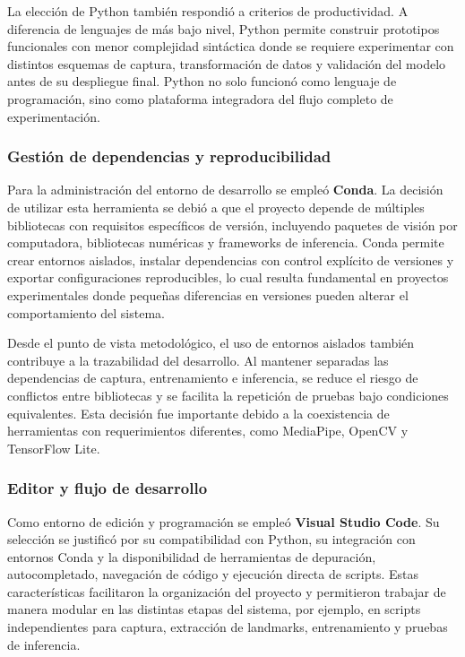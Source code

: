 	La elección de Python también respondió a criterios de productividad. A diferencia de lenguajes de más bajo nivel, Python permite construir prototipos funcionales con menor complejidad sintáctica donde se requiere experimentar con distintos esquemas de captura, transformación de datos y validación del modelo antes de su despliegue final. Python no solo funcionó como lenguaje de programación, sino como plataforma integradora del flujo completo de experimentación.
	
	\subsubsection{Gestión de dependencias y reproducibilidad}
	
	Para la administración del entorno de desarrollo se empleó \textbf{Conda}. La decisión de utilizar esta herramienta se debió a que el proyecto depende de múltiples bibliotecas con requisitos específicos de versión, incluyendo paquetes de visión por computadora, bibliotecas numéricas y frameworks de inferencia. Conda permite crear entornos aislados, instalar dependencias con control explícito de versiones y exportar configuraciones reproducibles, lo cual resulta fundamental en proyectos experimentales donde pequeñas diferencias en versiones pueden alterar el comportamiento del sistema.
	
	Desde el punto de vista metodológico, el uso de entornos aislados también contribuye a la trazabilidad del desarrollo. Al mantener separadas las dependencias de captura, entrenamiento e inferencia, se reduce el riesgo de conflictos entre bibliotecas y se facilita la repetición de pruebas bajo condiciones equivalentes. Esta decisión fue importante debido a la coexistencia de herramientas con requerimientos diferentes, como MediaPipe, OpenCV y TensorFlow Lite.
	
	\subsubsection{Editor y flujo de desarrollo}
	
	Como entorno de edición y programación se empleó \textbf{Visual Studio Code}. Su selección se justificó por su compatibilidad con Python, su integración con entornos Conda y la disponibilidad de herramientas de depuración, autocompletado, navegación de código y ejecución directa de scripts. Estas características facilitaron la organización del proyecto y permitieron trabajar de manera modular en las distintas etapas del sistema, por ejemplo, en scripts independientes para captura, extracción de landmarks, entrenamiento y pruebas de inferencia.
	
